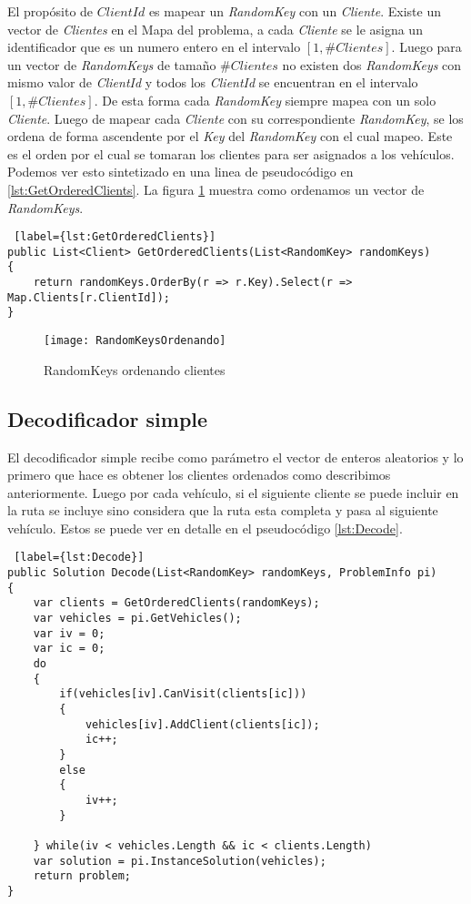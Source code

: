 El propósito de $ClientId$ es mapear un \textit{RandomKey} con un \textit{Cliente}. Existe un vector de \textit{Clientes} en el Mapa del problema, a cada \textit{Cliente} se le asigna un identificador que es un numero entero en el intervalo $[1, \#Clientes]$. Luego para un vector de \textit{RandomKeys} de tamaño $\#Clientes$ no existen dos \textit{RandomKeys} con mismo valor de \textit{ClientId} y todos los \textit{ClientId} se encuentran en el intervalo $[1, \#Clientes]$. De esta forma cada \textit{RandomKey} siempre mapea con un solo \textit{Cliente}. Luego de mapear cada \textit{Cliente} con su correspondiente \textit{RandomKey}, se los ordena de forma ascendente por el \textit{Key} del \textit{RandomKey} con el cual mapeo. Este es el orden por el cual se tomaran los clientes para ser asignados a los vehículos. Podemos ver esto sintetizado en una linea de pseudocódigo en \ref{lst:GetOrderedClients}. La figura \ref{fig:RandomKeysOrdenando} muestra como ordenamos un vector de \textit{RandomKeys}.

\bigskip

\begin{lstlisting} [label={lst:GetOrderedClients}]
public List<Client> GetOrderedClients(List<RandomKey> randomKeys)
{        
	return randomKeys.OrderBy(r => r.Key).Select(r => Map.Clients[r.ClientId]);
}
\end{lstlisting}

\begin{figure}[h]
	\caption{RandomKeys ordenando clientes}
	\centering
	\texttt{[image: RandomKeysOrdenando]}
	\label{fig:RandomKeysOrdenando}
\end{figure}

\subsection{Decodificador simple}

El decodificador simple recibe como parámetro el vector de enteros aleatorios y lo primero que hace es obtener los clientes ordenados como describimos anteriormente. Luego por cada vehículo, si el siguiente cliente se puede incluir en la ruta se incluye sino considera que la ruta esta completa y pasa al siguiente vehículo. Estos se puede ver en detalle en el pseudocódigo \ref{lst:Decode}. 

\bigskip

\begin{lstlisting} [label={lst:Decode}]
public Solution Decode(List<RandomKey> randomKeys, ProblemInfo pi)
{
	var clients = GetOrderedClients(randomKeys);
	var vehicles = pi.GetVehicles();	
	var iv = 0;
	var ic = 0;	
	do
	{
		if(vehicles[iv].CanVisit(clients[ic]))
		{
			vehicles[iv].AddClient(clients[ic]);
			ic++;
		}
		else
		{
			iv++;			
		}
		
	} while(iv < vehicles.Length && ic < clients.Length)	
	var solution = pi.InstanceSolution(vehicles);
	return problem;
}
\end{lstlisting}

